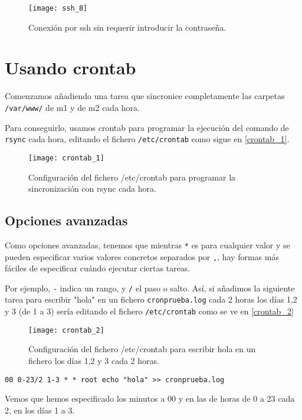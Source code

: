 \begin{figure}[h!]
\begin{center}
\caption{Conexión por ssh sin requerir introducir la contraseña.}
\label{ssh_8}
\texttt{[image: ssh\_8]}
\end{center}
\end{figure}

\chapter{Usando crontab}

Comenzamos añadiendo una tarea que sincronice completamente las carpetas \verb|/var/www/| de m1 y de m2 cada hora.

Para conseguirlo, usamos crontab para programar la ejecución del comando de \verb|rsync| cada hora, editando el fichero \verb|/etc/crontab| como sigue en \eqref{crontab_1}.

\begin{figure}[h!]
\begin{center}
\caption{Configuración del fichero /etc/crontab para programar la sincronización con rsync cada hora.}
\label{crontab_1}
\texttt{[image: crontab\_1]}
\end{center}
\end{figure}

\section{Opciones avanzadas}

Como opciones avanzadas, tenemos que mientras \verb|*| es para cualquier valor y se pueden especificar varios valores concretos separados por \verb|,|, hay formas más fáciles de especificar cuándo ejecutar ciertas tareas.

Por ejemplo, \verb|-| indica un rango, y \verb|/| el paso o salto. Así, si añadimos la siguiente tarea para escribir "hola" en un fichero \verb|cronprueba.log| cada 2 horas los días 1,2 y 3 (de 1 a 3) sería editando el fichero \verb|/etc/crontab| como se ve en \eqref{crontab_2}

\begin{figure}[h!]
\begin{center}
\caption{Configuración del fichero /etc/crontab para escribir hola en un fichero los días 1,2 y 3 cada 2 horas.}
\label{crontab_2}
\texttt{[image: crontab\_2]}
\end{center}
\end{figure}

\begin{verbatim}
00 0-23/2 1-3 * * root echo "hola" >> cronprueba.log
\end{verbatim}

Vemos que hemos especificado los minutos a 00 y en las de horas de 0 a 23 cada 2, en los días 1 a 3.










